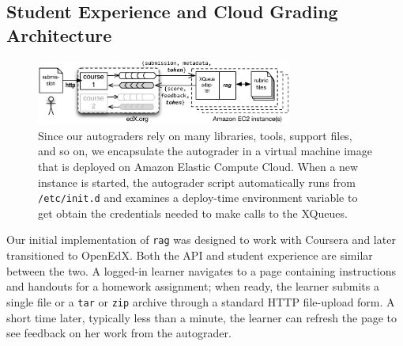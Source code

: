\subsection{Student Experience and Cloud Grading Architecture}

\begin{figure}
  \centering
  \includegraphics[width=0.75\textwidth]{figs/autograder_arch.pdf}
  \caption{\label{fig:arch}
  Since our autograders rely on many libraries,
  tools, support files, and so on, we encapsulate the autograder in a
  virtual machine image that is deployed on Amazon Elastic Compute Cloud.
  When a new instance is started, the autograder script automatically runs from
  \texttt{/etc/init.d} and examines a deploy-time environment variable
  to get obtain the credentials needed to make calls to the XQueues.}
\end{figure}


Our initial implementation of \texttt{rag} was designed to work with
Coursera and later transitioned to OpenEdX.  Both the API and student
experience are similar 
between the two.  A logged-in learner navigates to a page
containing instructions and handouts for a homework assignment;
when ready, the learner submits a single file or a
\texttt{tar} or \texttt{zip} archive through a standard HTTP
file-upload form.  A short time later, typically less than a minute, the
learner can refresh the page to see feedback on her work from the
autograder.  

